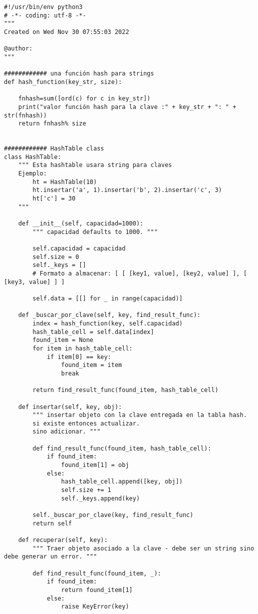 \begin{lstlisting}
#!/usr/bin/env python3
# -*- coding: utf-8 -*-
"""
Created on Wed Nov 30 07:55:03 2022

@author: 
"""

############ una función hash para strings
def hash_function(key_str, size):

    fnhash=sum([ord(c) for c in key_str]) 
    print("valor función hash para la clave :" + key_str + ": " + str(fnhash))
    return fnhash% size


############ HashTable class
class HashTable:
    """ Esta hashtable usara string para claves 
    Ejemplo:
        ht = HashTable(10)
        ht.insertar('a', 1).insertar('b', 2).insertar('c', 3)
        ht['c'] = 30
    """

    def __init__(self, capacidad=1000):
        """ capacidad defaults to 1000. """

        self.capacidad = capacidad
        self.size = 0
        self._keys = []
        # Formato a almacenar: [ [ [key1, value], [key2, value] ], [ [key3, value] ] ]
       
        self.data = [[] for _ in range(capacidad)]

    def _buscar_por_clave(self, key, find_result_func):
        index = hash_function(key, self.capacidad)
        hash_table_cell = self.data[index]
        found_item = None
        for item in hash_table_cell:
            if item[0] == key:
                found_item = item
                break

        return find_result_func(found_item, hash_table_cell)

    def insertar(self, key, obj):
        """ insertar objeto con la clave entregada en la tabla hash.
        si existe entonces actualizar.
        sino adicionar. """

        def find_result_func(found_item, hash_table_cell):
            if found_item:
                found_item[1] = obj
            else:
                hash_table_cell.append([key, obj])
                self.size += 1
                self._keys.append(key)

        self._buscar_por_clave(key, find_result_func)
        return self

    def recuperar(self, key):
        """ Traer objeto asociado a la clave - debe ser un string sino debe generar un error. """

        def find_result_func(found_item, _):
            if found_item:
                return found_item[1]
            else:
                raise KeyError(key)


\end{lstlisting}
